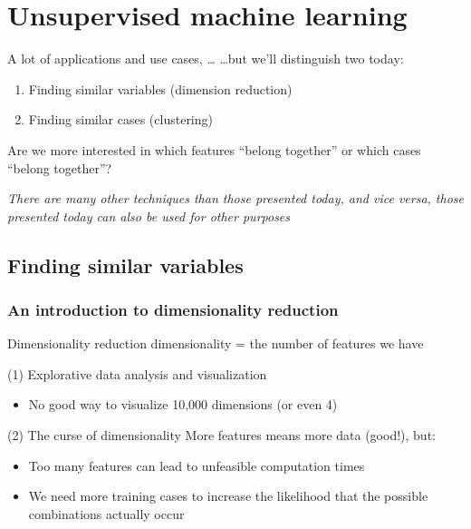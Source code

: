 


\section[Unsupervised ML]{Unsupervised machine learning}

\begin{frame}{A lot of applications and use cases, \ldots}
\ldots but we'll distinguish two today:

\begin{enumerate}
\item Finding similar variables (dimension reduction)
\item Finding similar cases (clustering)
\end{enumerate}

\pause

Are we more interested in which features ``belong together'' or which cases ``belong together''? 

\emph{There are many other techniques than those presented today, and vice versa, those presented today can also be used for other purposes}

\end{frame}

\subsection{Finding similar variables}

\subsubsection{An introduction to dimensionality reduction}

\begin{frame}{Dimensionality reduction}
dimensionality = the number of features we have



\begin{block}{(1) Explorative data analysis and visualization}
\begin{itemize}
\item No good way to visualize 10,000 dimensions (or even 4)
\end{itemize}
\end{block}

\pause


\begin{block}{(2) The curse of dimensionality}
More features means more data (good!), but:
\begin{itemize}
\item Too many features can lead to unfeasible computation times
\item We need more training cases to increase the likelihood that the possible combinations actually occur
\end{itemize}
\end{block}
\end{frame}



